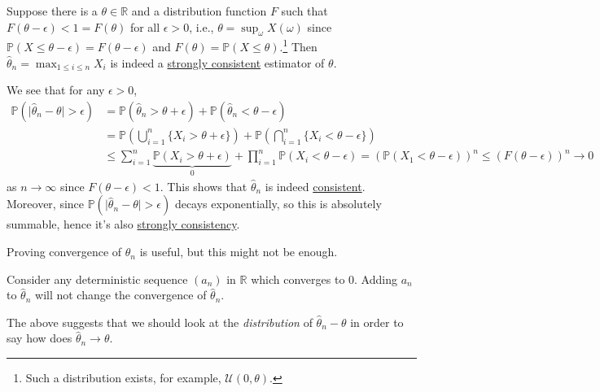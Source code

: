 \begin{eg}
	Suppose there is a \(\theta \in \mathbb{R} \) and a distribution function \(F\) such that \(F(\theta - \epsilon ) < 1 = F(\theta )\) for all \(\epsilon > 0\), i.e., \(\theta = \sup_{\omega } X(\omega )\) since \(\mathbb{P} (X \leq \theta - \epsilon ) = F(\theta - \epsilon )\) and \(F(\theta ) = \mathbb{P} (X \leq \theta )\).\footnote{Such a distribution exists, for example, \(\mathcal{U} (0, \theta )\).} Then \(\hat{\theta} _n = \max _{1 \leq i \leq n} X_i \) is indeed a \hyperref[def:strongly-consistent]{strongly consistent} estimator of \(\theta \).
\end{eg}
\begin{explanation}
	We see that for any \(\epsilon > 0\),
	\[
		\begin{split}
			\mathbb{P} (\vert \hat{\theta} _n - \theta \vert > \epsilon )
			 & = \mathbb{P} (\hat{\theta} _n > \theta + \epsilon ) + \mathbb{P} (\hat{\theta} _n < \theta - \epsilon )                                                  \\
			 & = \mathbb{P} \left( \bigcup_{i=1}^{n} \{ X_i > \theta + \epsilon \}  \right) + \mathbb{P} \left( \bigcap_{i=1}^{n} \{ X_i < \theta - \epsilon \} \right) \\
			 & \leq \sum_{i=1}^{n} \underbrace{\mathbb{P} (X_i > \theta + \epsilon )}_{0} + \prod_{i=1}^{n} \mathbb{P} (X_i < \theta -\epsilon )
			= \left( \mathbb{P} (X_1 < \theta - \epsilon ) \right) ^n
			\leq \left( F(\theta - \epsilon ) \right) ^n \to 0
		\end{split}
	\]
	as \(n \to \infty \) since \(F(\theta - \epsilon ) < 1\). This shows that \(\hat{\theta} _n\) is indeed \hyperref[def:consistent]{consistent}. Moreover, since \(\mathbb{P} (\vert \hat{\theta} _n - \theta \vert > \epsilon )\) decays exponentially, so this is absolutely summable, hence it's also \hyperref[def:strongly-consistent]{strongly consistency}.
\end{explanation}

Proving convergence of \(\hat{\theta} _n\) is useful, but this might not be enough.

\begin{eg}
	Consider any deterministic sequence \((a_n)\) in \(\mathbb{R} \) which converges to \(0\). Adding \(a_n\) to \(\hat{\theta} _n\) will not change the convergence of \(\hat{\theta} _n\).
\end{eg}

The above suggests that we should look at the \emph{distribution} of \(\hat{\theta} _n - \theta \) in order to say how does \(\hat{\theta} _n \to \theta \).

